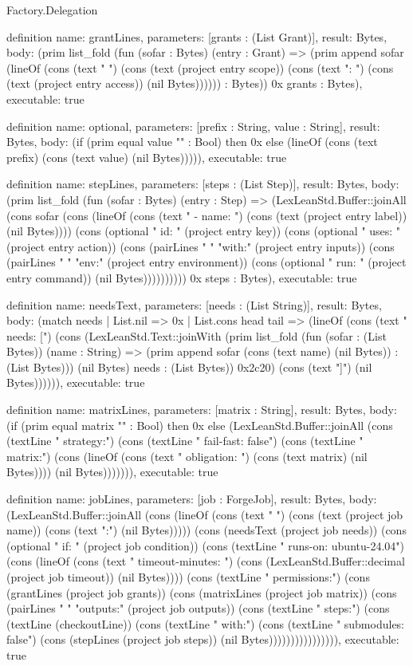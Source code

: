 \begin{lexlean}{Factory.Delegation}
\begin{semanticmodule}
definition{
  name: grantLines,
  parameters: [grants : (List Grant)],
  result: Bytes,
  body: (prim list_fold (fun (sofar : Bytes) (entry : Grant) => (prim append sofar (lineOf (cons (text "      ") (cons (text (project entry scope)) (cons (text ": ") (cons (text (project entry access)) (nil Bytes)))))) : Bytes)) 0x grants : Bytes),
  executable: true
}

definition{
  name: optional,
  parameters: [prefix : String, value : String],
  result: Bytes,
  body: (if (prim equal value "" : Bool) then 0x else (lineOf (cons (text prefix) (cons (text value) (nil Bytes))))),
  executable: true
}

definition{
  name: stepLines,
  parameters: [steps : (List Step)],
  result: Bytes,
  body: (prim list_fold (fun (sofar : Bytes) (entry : Step) => (LexLeanStd.Buffer::joinAll (cons sofar (cons (lineOf (cons (text "      - name: ") (cons (text (project entry label)) (nil Bytes)))) (cons (optional "        id: " (project entry key)) (cons (optional "        uses: " (project entry action)) (cons (pairLines "        " "with:" (project entry inputs)) (cons (pairLines "        " "env:" (project entry environment)) (cons (optional "        run: " (project entry command)) (nil Bytes)))))))))) 0x steps : Bytes),
  executable: true
}

definition{
  name: needsText,
  parameters: [needs : (List String)],
  result: Bytes,
  body: (match needs
      | List.nil => 0x
      | List.cons head tail => (lineOf (cons (text "    needs: [") (cons (LexLeanStd.Text::joinWith (prim list_fold (fun (sofar : (List Bytes)) (name : String) => (prim append sofar (cons (text name) (nil Bytes)) : (List Bytes))) (nil Bytes) needs : (List Bytes)) 0x2c20) (cons (text "]") (nil Bytes)))))),
  executable: true
}

definition{
  name: matrixLines,
  parameters: [matrix : String],
  result: Bytes,
  body: (if (prim equal matrix "" : Bool) then 0x else (LexLeanStd.Buffer::joinAll (cons (textLine "    strategy:") (cons (textLine "      fail-fast: false") (cons (textLine "      matrix:") (cons (lineOf (cons (text "        obligation: ") (cons (text matrix) (nil Bytes)))) (nil Bytes))))))),
  executable: true
}

definition{
  name: jobLines,
  parameters: [job : ForgeJob],
  result: Bytes,
  body: (LexLeanStd.Buffer::joinAll (cons (lineOf (cons (text "  ") (cons (text (project job name)) (cons (text ":") (nil Bytes))))) (cons (needsText (project job needs)) (cons (optional "    if: " (project job condition)) (cons (textLine "    runs-on: ubuntu-24.04") (cons (lineOf (cons (text "    timeout-minutes: ") (cons (LexLeanStd.Buffer::decimal (project job timeout)) (nil Bytes)))) (cons (textLine "    permissions:") (cons (grantLines (project job grants)) (cons (matrixLines (project job matrix)) (cons (pairLines "    " "outputs:" (project job outputs)) (cons (textLine "    steps:") (cons (textLine (checkoutLine)) (cons (textLine "        with:") (cons (textLine "          submodules: false") (cons (stepLines (project job steps)) (nil Bytes)))))))))))))))),
  executable: true
}


\end{semanticmodule}
\end{lexlean}
